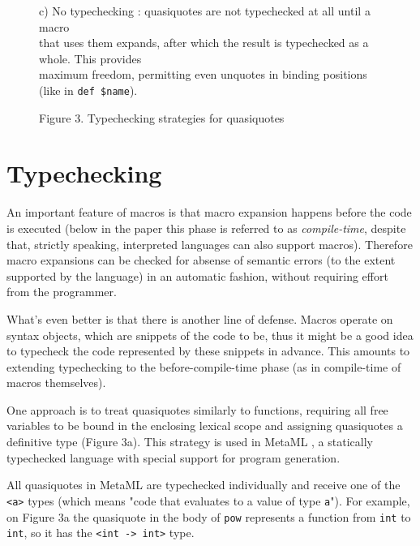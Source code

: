 \documentclass[10pt,journal,a4paper]{IEEEtran}
\begin{document}
\begin{figure*}[t]
\begin{listing}
\begin{adjustwidth}{2.5cm}{0pt}
c) No typechecking \cite{skalski05, skalski04}: quasiquotes are not typechecked at all until a
macro\\ that uses them expands, after which the result is typechecked as a whole. This provides\\
maximum freedom, permitting even unquotes in binding positions (like in \texttt{def \$name}).
\end{adjustwidth}

\end{listing}
\end{figure*}

\begin{figure*}
\hskip5.48cm
\normalsize Figure 3. Typechecking strategies for quasiquotes
\end{figure*}

\section{Typechecking}

An important feature of macros is that macro expansion happens before the code is executed (below in
the paper this phase is referred to as \emph{compile-time}, despite that, strictly speaking, interpreted
languages can also support macros). Therefore macro expansions can be checked for
absense of semantic errors (to the extent supported by the language) in an automatic fashion,
without requiring effort from the programmer.

What's even better is that there is another line of defense.
Macros operate on syntax objects, which are snippets of the code to be,
thus it might be a good idea to typecheck the code represented by these snippets
in advance. This amounts to extending typechecking to the before-compile-time phase
(as in compile-time of macros themselves).

One approach is to treat quasiquotes similarly to functions, requiring all free variables
to be bound in the enclosing lexical scope and assigning quasiquotes a definitive type (Figure 3a).
This strategy is used in MetaML \cite{taha99}, a statically typechecked
language with special support for program generation.

All quasiquotes in MetaML are typechecked individually
and receive one of the \texttt{<a>}
types (which means "code that evaluates to a value of type \texttt{a}").
For example, on Figure 3a the quasiquote in the body of \texttt{pow}
represents a function from \texttt{int} to \texttt{int}, so it has the
\texttt{<int -> int>} type.
\end{document}
